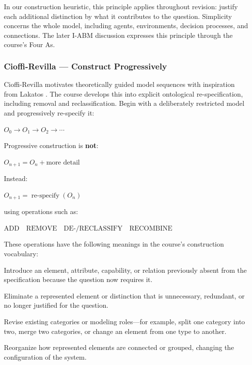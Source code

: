 \documentclass[11pt,a4paper]{article}
\newenvironment{fitdisplay}{\par\medskip\noindent\begin{lrbox}{\displaybox}$\displaystyle}{%
$\end{lrbox}\makebox[\linewidth][c]{\ifdim\wd\displaybox>\linewidth\resizebox{\linewidth}{!}{\usebox{\displaybox}}\else\usebox{\displaybox}\fi}\par\medskip}
\begin{document}
In our construction heuristic, this principle applies throughout revision: justify each additional distinction by what it contributes to the question. Simplicity concerns the whole model, including agents, environments, decision processes, and connections. The later I-ABM discussion expresses this principle through the course's Four As.

\subsubsection{Cioffi-Revilla --- Construct Progressively}

Cioffi-Revilla motivates theoretically guided model sequences with inspiration from Lakatos \cite{cioffi}. The course develops this into explicit ontological re-specification, including removal and reclassification. Begin with a deliberately restricted model and progressively re-specify it:

\begin{fitdisplay}
\boxed{
O_0\rightarrow O_1\rightarrow O_2\rightarrow\cdots
}
\end{fitdisplay}

Progressive construction is \textbf{not}:

\begin{fitdisplay}
O_{n+1}=O_n+\text{more detail}
\end{fitdisplay}

Instead:

\begin{fitdisplay}
\boxed{
O_{n+1}=\operatorname{re-specify}(O_n)
}
\end{fitdisplay}

using operations such as:

\begin{fitdisplay}
\boxed{
\text{ADD}
\quad
\text{REMOVE}
\quad
\text{DE-/RECLASSIFY}
\quad
\text{RECOMBINE}
}
\end{fitdisplay}

These operations have the following meanings in the course's construction vocabulary:

\begin{description}[style=nextline,leftmargin=0pt,labelindent=0pt,labelsep=0pt,labelwidth=0pt,itemindent=0pt,itemsep=4pt]
\item[ADD] Introduce an element, attribute, capability, or relation previously absent from the specification because the question now requires it.
\item[REMOVE] Eliminate a represented element or distinction that is unnecessary, redundant, or no longer justified for the question.
\item[DE-/RECLASSIFY] Revise existing categories or modeling roles---for example, split one category into two, merge two categories, or change an element from one type to another.
\item[RECOMBINE] Reorganize how represented elements are connected or grouped, changing the configuration of the system.
\end{description}
\end{document}
